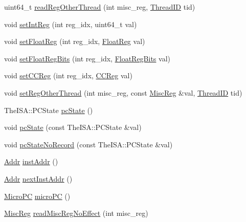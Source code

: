 \begin{DoxyCompactItemize}
\item 
uint64\_\-t \hyperlink{classInOrderThreadContext_a207d863e4bad4245020ea32adbaf625a}{readRegOtherThread} (int misc\_\-reg, \hyperlink{base_2types_8hh_ab39b1a4f9dad884694c7a74ed69e6a6b}{ThreadID} tid)
\item 
void \hyperlink{classInOrderThreadContext_abc264e8ee37c6bd7d7b5759b97c34356}{setIntReg} (int reg\_\-idx, uint64\_\-t val)
\item 
void \hyperlink{classInOrderThreadContext_ab6fd8e55b81c173f448ec0c42bc28b99}{setFloatReg} (int reg\_\-idx, \hyperlink{classThreadContext_a75484259f1855aabc8d74c6eb1cfe186}{FloatReg} val)
\item 
void \hyperlink{classInOrderThreadContext_a618651078f08ecd328dfe3312f0f2ea7}{setFloatRegBits} (int reg\_\-idx, \hyperlink{classThreadContext_aab5eeae86499f9bfe15ef79360eccc64}{FloatRegBits} val)
\item 
void \hyperlink{classInOrderThreadContext_afd6c42b1888ad21a4382078ca7a86d09}{setCCReg} (int reg\_\-idx, \hyperlink{classThreadContext_a0c9de550a32808e6a25b54b6c791d5ab}{CCReg} val)
\item 
void \hyperlink{classInOrderThreadContext_ae9e72cf93b574d00d7f1652fcafe7449}{setRegOtherThread} (int misc\_\-reg, const \hyperlink{classThreadContext_aaf5f073a387db0556d1db4bcc45428bc}{MiscReg} \&val, \hyperlink{base_2types_8hh_ab39b1a4f9dad884694c7a74ed69e6a6b}{ThreadID} tid)
\item 
TheISA::PCState \hyperlink{classInOrderThreadContext_a827fb3454585cf4c620f4fd341966317}{pcState} ()
\item 
void \hyperlink{classInOrderThreadContext_a5e9cfc754c9ef9b7db875ce89871944e}{pcState} (const TheISA::PCState \&val)
\item 
void \hyperlink{classInOrderThreadContext_a6005386aeeaecb35499c3199fb47ba2f}{pcStateNoRecord} (const TheISA::PCState \&val)
\item 
\hyperlink{base_2types_8hh_af1bb03d6a4ee096394a6749f0a169232}{Addr} \hyperlink{classInOrderThreadContext_a53c92716db281ae16ffb693c6d7803c7}{instAddr} ()
\item 
\hyperlink{base_2types_8hh_af1bb03d6a4ee096394a6749f0a169232}{Addr} \hyperlink{classInOrderThreadContext_aceec6e28772f91b3cc921c0e3927b0c2}{nextInstAddr} ()
\item 
\hyperlink{base_2types_8hh_adfb4d8b20c5abc8be73dd367b16f2d57}{MicroPC} \hyperlink{classInOrderThreadContext_a1a21696f33a7d38f251687ae0b5e9718}{microPC} ()
\item 
\hyperlink{classThreadContext_aaf5f073a387db0556d1db4bcc45428bc}{MiscReg} \hyperlink{classInOrderThreadContext_a7b5ac6af9c2c19d7c1b442b8a3aebbc6}{readMiscRegNoEffect} (int misc\_\-reg)

\end{DoxyCompactItemize}

